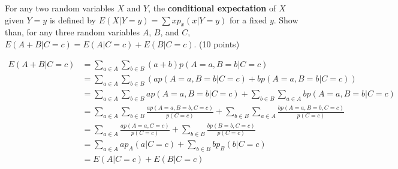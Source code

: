\documentclass[fleqn]{homework}
\begin{document}
  \begin{problem}{3}
    \begin{question}
      For any two random variables $X$ and $Y$, the \textbf{conditional
        expectation} of $X$ given $Y=y$ is defined by
      $E(X|Y=y) = \sum x p_x(x|Y=y)$ for a fixed $y$.  Show than, for any three
      random variables $A$, $B$, and $C$, $E(A+B|C=c) = E(A|C=c) +
      E(B|C=c)$. (10 points)
    \end{question}

    \begin{align*}
      E(A + B | C=c) &= \sum_{a\in A} \sum_{b\in B} (a+b)p(A=a,B=b|C=c) \\
                     &= \sum_{a\in A} \sum_{b\in B} \left(a p(A=a,B=b|C=c) + b p(A=a,B=b|C=c) \right) \\
                     &= \sum_{a\in A} \sum_{b\in B} a p(A=a,B=b|C=c) + \sum_{b\in B} \sum_{a\in A} b p(A=a,B=b|C=c) \\
                     &= \sum_{a\in A} \sum_{b\in B} \frac{ap(A=a,B=b,C=c)}{p(C=c)} + \sum_{b\in B} \sum_{a\in A} \frac{bp(A=a,B=b,C=c)}{p(C=c)} \\
                     &= \sum_{a\in A} \frac{ap(A=a,C=c)}{p(C=c)} + \sum_{b\in B} \frac{bp(B=b,C=c)}{p(C=c)} \\
                     &= \sum_{a\in A} a p_A(a|C=c) + \sum_{b\in B} bp_B(b|C=c) \\
                     &= E(A|C=c) + E(B|C=c) \\
    \end{align*}
  \end{problem}
\end{document}
